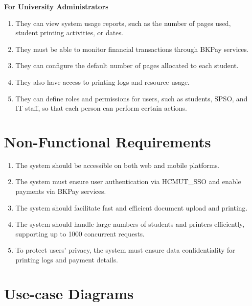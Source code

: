 \documentclass[a4paper]{report}
\begin{document}
\newpage
\textbf{For University Administrators}
\begin{enumerate}
    \item They can view system usage reports, such as the number of pages used, student printing activities, or dates.
    \item They must be able to monitor financial transactions through BKPay services.
    \item They can configure the default number of pages allocated to each student.
    \item They also have access to printing logs and resource usage.
    \item They can define roles and permissions for users, such as students, SPSO, and IT staff, so that each person can perform certain actions.
\end{enumerate}

\section{Non-Functional Requirements}
\begin{enumerate}
    \item The system should be accessible on both web and mobile platforms.
    \item The system must ensure user authentication via HCMUT\_SSO and enable payments via BKPay services.
    \item The system should facilitate fast and efficient document upload and printing.
    \item The system should handle large numbers of students and printers efficiently, supporting up to 1000 concurrent requests.
    \item To protect users' privacy, the system must ensure data confidentiality for printing logs and payment details.
\end{enumerate}

\section{Use-case Diagrams}
\end{document}
